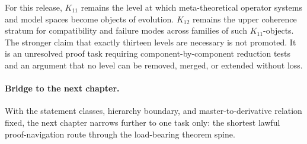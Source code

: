 For this release, \(K_{11}\) remains the level at which meta-theoretical
operator systems and model spaces become objects of evolution. \(K_{12}\)
remains the upper coherence stratum for compatibility and failure modes across
families of such \(K_{11}\)-objects. The stronger claim that exactly thirteen
levels are necessary is not promoted. It is an unresolved proof task requiring
component-by-component reduction tests and an argument that no level can be
removed, merged, or extended without loss.

\paragraph{Bridge to the next chapter.}
With the statement classes, hierarchy boundary, and master-to-derivative
relation fixed, the next chapter narrows further to one task only: the shortest
lawful proof-navigation route through the load-bearing theorem spine.

\clearpage
